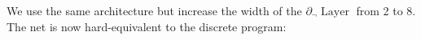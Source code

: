 \documentclass{article} %
\begin{document}
We use the same architecture but increase the width of the $\partial_{\neg}\!\operatorname{Layer}$ from 2 to 8. The net is now hard-equivalent to the discrete program:

\end{document}
